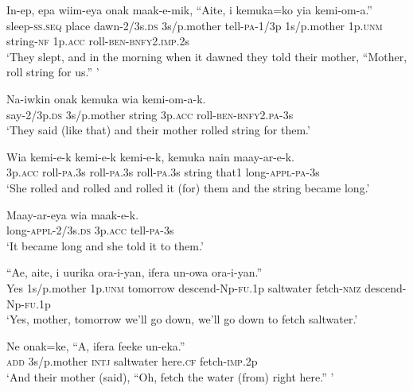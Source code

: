 \ea
\gll  In-ep,  epa  wiim-eya  onak  maak-e-mik,  “Aite,                     i  kemuka=ko  yia  kemi-om-a.” \\
sleep-\textsc{ss.seq}  place  dawn-2/3s.\textsc{ds}  3s/p.mother  tell-\textsc{pa}-1/3p  1s/p.mother  1p.\textsc{unm}  string-\textsc{nf}  1p.\textsc{acc}  roll-\textsc{ben}-\textsc{bnfy}2.\textsc{imp}.2s \\


\glt ‘They slept, and in the morning when it dawned they told their mother, “Mother, roll string for us.” ’ \\
\z


\ea
\gll  Na-iwkin  onak  kemuka  wia  kemi-om-a-k. \\
say-2/3p.\textsc{ds}  3s/p.mother  string  3p.\textsc{acc}  roll-\textsc{ben}-\textsc{bnfy}2.\textsc{pa}-3s \\
\glt ‘They said (like that) and their mother rolled string for them.’ \\
\z


\ea
\gll  Wia  kemi-e-k  kemi-e-k  kemi-e-k,  kemuka  nain  maay-ar-e-k. \\
3p.\textsc{acc}  roll-\textsc{pa}.3s  roll-\textsc{pa}.3s  roll-\textsc{pa}.3s  string  that1  long-\textsc{appl}-\textsc{pa}-3s \\
\glt ‘She rolled and rolled and rolled it (for) them and the string became long.’ \\
\z


\ea
\gll  Maay-ar-eya  wia  maak-e-k. \\
long-\textsc{appl}-2/3s.\textsc{ds}  3p.\textsc{acc}  tell-\textsc{pa}-3s \\
\glt ‘It became long and she told it to them.’ \\
\z


\ea
\gll  “Ae,  aite,  i  uurika  ora-i-yan,  ifera                  un-owa  ora-i-yan.” \\
Yes  1s/p.mother  1p.\textsc{unm}  tomorrow  descend-Np-\textsc{fu}.1p  saltwater  fetch-\textsc{nmz}  descend-Np-\textsc{fu}.1p \\


\glt ‘Yes, mother, tomorrow we’ll go down, we’ll go down to fetch saltwater.’ \\
\z


\ea
\gll  Ne  onak=ke,  “A,  ifera  feeke  un-eka.” \\
\textsc{add}  3s/p.mother  \textsc{intj}  saltwater  here.\textsc{cf}  fetch-\textsc{imp}.2p \\
\glt ‘And their mother (said), “Oh, fetch the water (from) right here.” ’ \\
\z


